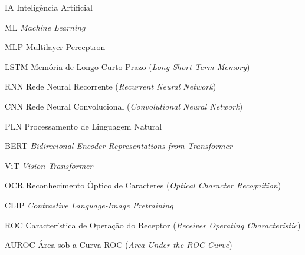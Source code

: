 \begin{siglas}
  \item[IA] Inteligência Artificial
  \item[ML] \textit{Machine Learning}
  \item[MLP] Multilayer Perceptron 
  \item[LSTM] Memória de Longo Curto Prazo (\textit{Long Short-Term Memory}) 
  \item[RNN] Rede Neural Recorrente (\textit{Recurrent Neural Network}) 
  \item[CNN] Rede Neural Convolucional (\textit{Convolutional Neural Network})
  \item[PLN] Processamento de Linguagem Natural
  \item[BERT] \textit{Bidirecional Encoder Representations from Transformer}
  \item[ViT] \textit{Vision Transformer}
  \item[OCR] Reconhecimento Óptico de Caracteres (\textit{Optical Character Recognition}) 
  \item[CLIP] \textit{Contrastive Language-Image Pretraining}
  \item[ROC] Característica de Operação do Receptor (\textit{Receiver Operating Characteristic})
  \item[AUROC] Área sob a Curva ROC (\textit{Area Under the ROC Curve})
\end{siglas}